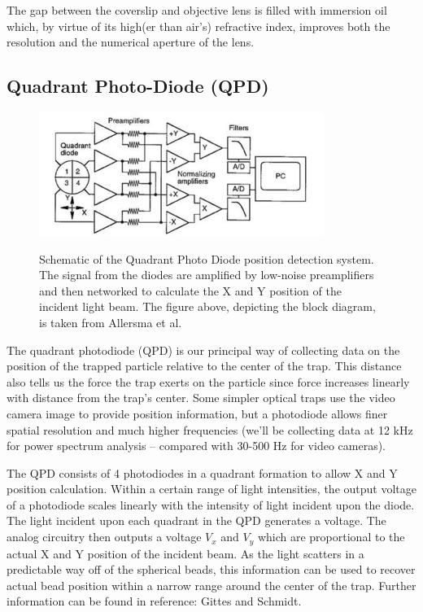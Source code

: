 \documentclass{../lab}
\begin{document}
The gap between the coverslip and objective lens is filled with immersion oil which, by virtue of its high(er than air's) refractive index, improves both the resolution and the numerical aperture of the lens.

\subsection{Quadrant Photo-Diode (QPD)}

\begin{figure}[h]
    \centering
    \href{http://experimentationlab.berkeley.edu/sites/default/files/images/350px-QPD2.jpg}{\includegraphics[width=0.5\linewidth]{images/350px-QPD2.jpg}}
    \caption{Schematic of the Quadrant Photo Diode position detection system. The signal from the diodes are amplified by low-noise preamplifiers and then networked to calculate the X and Y position of the incident light beam. The figure above, depicting the block diagram, is taken from  Allersma et al.}
    \label{fig:350px-QPD2}
\end{figure}

The quadrant photodiode (QPD) is our principal way of collecting data on the position of the trapped particle relative to the center of the trap. This distance also tells us the force the trap exerts on the particle since force increases linearly with distance from the trap's center. Some simpler optical traps use the video camera image to provide position information, but a photodiode allows finer spatial resolution and much higher frequencies (we'll be collecting data at 12 kHz for power spectrum analysis -- compared with 30-500 Hz for video cameras).

The QPD consists of 4 photodiodes in a quadrant formation to allow X and Y position calculation. Within a certain range of light intensities, the output voltage of a photodiode scales linearly with the intensity of light incident upon the diode. The light incident upon each quadrant in the QPD generates a voltage. The analog circuitry then outputs a voltage $V_x$ and $V_y$ which are proportional to the actual X and Y position of the incident beam. As the light scatters in a predictable way off of the spherical beads, this information can be used to recover actual bead position within a narrow range around the center of the trap. Further information can be found in reference: Gittes and Schmidt.
\end{document}
